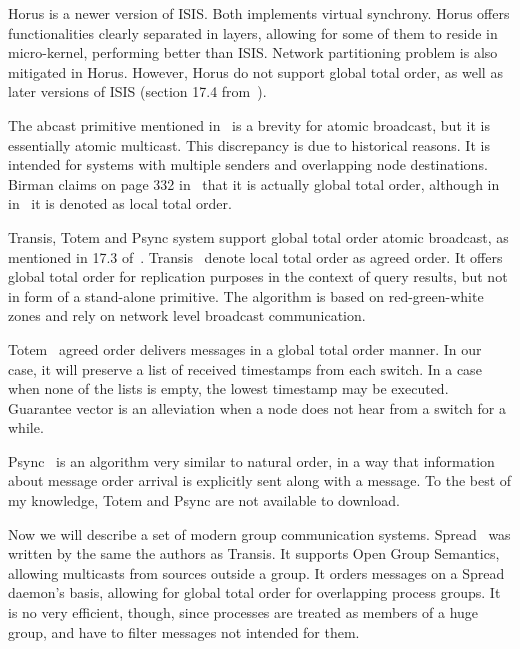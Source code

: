 \documentclass{sig-semester}
\begin{document}
Horus is a newer version of ISIS. Both implements virtual synchrony. Horus offers functionalities clearly separated in layers, allowing for some of them to reside in micro-kernel, performing better than ISIS. Network partitioning problem is also mitigated in Horus. However, Horus do not support global total order, as well as later versions of ISIS (section 17.4 from~\cite{Birman06}).

The abcast primitive mentioned in~\cite{Birman87b} is a brevity for atomic broadcast, but it is essentially atomic multicast. This discrepancy is due to historical reasons. It is intended for systems with multiple senders and overlapping node destinations. Birman claims on page 332 in~\cite{Birman06} that it is actually global total order, although in in~\cite{hadzilacos94} it is denoted as local total order.


Transis, Totem and Psync system support global total order atomic broadcast, as mentioned in 17.3 of~\cite{Birman06}. Transis~\cite{Amir95} denote local total order as agreed order. It offers global total order for replication purposes in the context of query results, but not in form of a stand-alone primitive. The algorithm is based on red-green-white zones and rely on network level broadcast communication.

Totem~\cite{moser96} agreed order delivers messages in a global total order manner. In our case, it will preserve a list of received timestamps from each switch. In a case when none of the lists is empty, the lowest timestamp may be executed. Guarantee vector is an alleviation when a node does not hear from a switch for a while.

Psync~\cite{Peterson89} is an algorithm very similar to natural order, in a way that information about message order arrival is explicitly sent along with a message. To the best of my knowledge, Totem and Psync are not available to download.

Now we will describe a set of modern group communication systems. Spread~\cite{Amir04} was written by the same the authors as Transis. It supports Open Group Semantics, allowing multicasts from sources outside a group. It orders messages on a Spread daemon's basis, allowing for global total order for overlapping process groups. It is no very efficient, though, since processes are treated as members of a huge group, and have to filter messages not intended for them.
\end{document}
